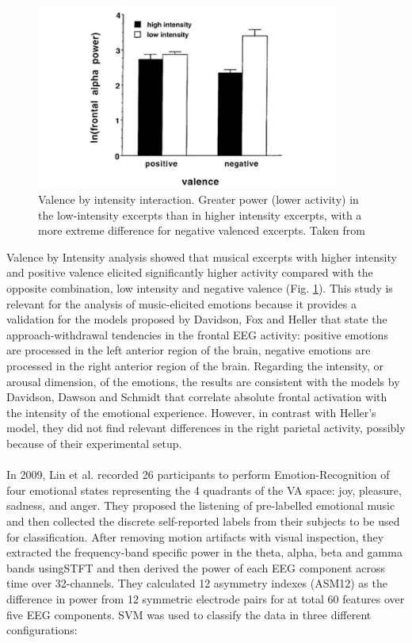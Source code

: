 \begin{figure}[h!]
\includegraphics[width=10cm]{img/related_work/valence_intensity.png}
\centering
\caption{Valence by intensity interaction. Greater power (lower activity) in the low-intensity excerpts than in higher intensity excerpts, with a more extreme difference for negative valenced excerpts. Taken from \cite{schmidt_frontal_2001}}\label{fig_schmidt_valence_intensity}
\end{figure}
Valence by Intensity analysis showed that musical excerpts with higher intensity and positive valence elicited significantly higher activity compared with the opposite combination, low intensity and negative valence (Fig. \ref{fig_schmidt_valence_intensity}). This study is relevant for the analysis of music-elicited emotions because it provides a validation for the models proposed by Davidson, Fox and Heller that state the approach-withdrawal tendencies in the frontal \ac{EEG} activity: positive emotions are processed in the left anterior region of the brain, negative emotions are processed in the right anterior region of the brain. Regarding the intensity, or arousal dimension, of the emotions, the results are consistent with the models by Davidson, Dawson and Schmidt that correlate absolute frontal activation with the intensity of the emotional experience. However, in contrast with Heller’s model, they did not find relevant differences in the right parietal activity, possibly because of their experimental setup.
\\
\\
In 2009, Lin et al. \cite{lin_eeg-based_2009} recorded 26 participants to perform Emotion-Recognition of four emotional states representing the 4 quadrants of the \ac{VA} space: joy, pleasure, sadness, and anger. They proposed the listening of pre-labelled emotional music and then collected the discrete self-reported labels from their subjects to be used for classification. After removing motion artifacts with visual inspection, they extracted the frequency-band specific power in the theta, alpha, beta and gamma bands using\ac{STFT} and then derived the power of each \ac{EEG} component across time over 32-channels. They calculated 12 asymmetry indexes (ASM12) as the difference in power from 12 symmetric electrode pairs for at total 60 features over five \ac{EEG} components. \ac{SVM} was used to classify the data in three different configurations:
